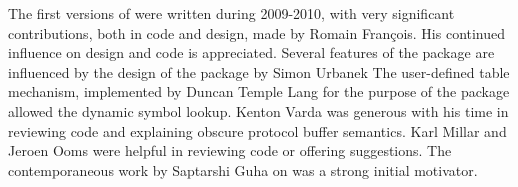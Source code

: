 \documentclass[article]{jss}
\newcommand{\CRANpkg}[1]{\pkg{#1}}
\begin{document}
The first versions of \CRANpkg{RProtoBuf} were written during 2009-2010,
with very significant contributions, both in code and design, made by
Romain Fran\c{c}ois. His continued influence on design and code is
appreciated. Several features of the package are influenced
by the design of the \CRANpkg{rJava} package by Simon Urbanek
The user-defined table mechanism, implemented by Duncan Temple Lang for the
purpose of the  package allowed the dynamic symbol lookup.
Kenton Varda was generous with his time in reviewing code and explaining
obscure protocol buffer semantics.  Karl Millar and Jeroen Ooms were
helpful in reviewing code or offering suggestions.  The contemporaneous
work by Saptarshi Guha on  was a strong initial motivator.



\end{document}
